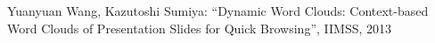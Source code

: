 \documentclass{js}
\begin{document}
\begin{thebibliography}{99}





 Yuanyuan Wang, Kazutoshi Sumiya:
``Dynamic Word Clouds: Context-based Word Clouds of Presentation Slides for Quick Browsing'',
IIMSS, 2013


\end{thebibliography}
\end{document}
